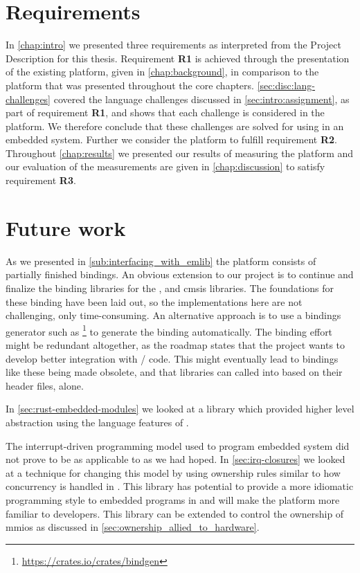 \section{Requirements}

In \autoref{chap:intro} we presented three requirements as interpreted from the Project Description for this thesis.
Requirement \textbf{R1} is achieved through the presentation of the existing {\C} platform, given in \autoref{chap:background}, in comparison to the {\rust} platform that was presented throughout the core chapters.
\autoref{sec:disc:lang-challenges} covered the language challenges discussed in \autoref{sec:intro:assignment}, as part of requirement \textbf{R1}, and shows that each challenge is considered in the {\rg} platform.
We therefore conclude that these challenges are solved for using {\rust} in an embedded system.
Further we consider the {\rg} platform to fulfill requirement \textbf{R2}.
Throughout \autoref{chap:results} we presented our results of measuring the {\rg} platform and our evaluation of the measurements are given in \autoref{chap:discussion} to satisfy requirement \textbf{R3}.

\section{Future work}
\label{chap:future}

As we presented in \autoref{sub:interfacing_with_emlib} the platform consists of partially finished bindings.
An obvious extension to our project is to continue and finalize the binding libraries for the {\emlib}, {\emdrv} and \gls{cmsis} libraries.
The foundations for these binding have been laid out, so the implementations here are not challenging, only time-consuming.
An alternative approach is to use a bindings generator such as \footnote{\url{https://crates.io/crates/bindgen}} to generate the binding automatically.
The binding effort might be redundant altogether, as the {\rust} roadmap \cite{web:roadmap} states that the project wants to develop better integration with {\C}/{\Cpp} code.
This might eventually lead to bindings like these being made obsolete, and that {\C} libraries can called into based on their header files, alone.

In \autoref{sec:rust-embedded-modules} we looked at a library which provided higher level abstraction using the language features of {\rust}.

The interrupt-driven programming model used to program embedded system did not prove to be as applicable to {\rust} as we had hoped.
In \autoref{sec:irq-closures} we looked at a technique for changing this model by using ownership rules similar to how concurrency is handled in {\rust}.
This library has potential to provide a more idiomatic programming style to embedded programs in {\rust} and will make the platform more familiar to {\rust} developers.
This library can be extended to control the ownership of \glspl{mmio} as discussed in \autoref{sec:ownership_allied_to_hardware}.


